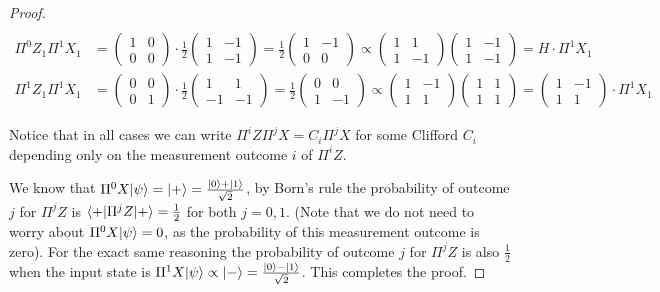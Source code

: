 \begin{proof}
\begin{align*}
	\end{align*}
	\begin{align*}
		\Pi^0 Z_1 \Pi^1 X_1 &= 
		\begin{pmatrix} 1 & 0 \\ 0 & 0 \end{pmatrix} 
		\cdot 
		\frac{1}{2} \begin{pmatrix} 1 & -1 \\ 1 & -1 \end{pmatrix}
		=
		\frac{1}{2} \begin{pmatrix} 1 & -1 \\ 0 & 0 \end{pmatrix}	
		\propto
		\begin{pmatrix} 1 & 1 \\ 1 & -1 \end{pmatrix} 
		\begin{pmatrix} 1 & -1 \\ 1 & -1	\end{pmatrix}
		= H \cdot \Pi^1 X_1
	\end{align*}
	\begin{align*}
		\Pi^1 Z_1 \Pi^1 X_1 &= 
		\begin{pmatrix} 0 & 0 \\ 0 & 1 \end{pmatrix} 
		\cdot 
		\frac{1}{2} \begin{pmatrix} 1 & 1 \\ -1 & -1 \end{pmatrix}
		=
		\frac{1}{2} \begin{pmatrix} 0 & 0 \\ 1 & -1 \end{pmatrix}	
		\propto
		\begin{pmatrix} 1 & -1 \\ 1 & 1 \end{pmatrix} 
		\begin{pmatrix} 1 & 1 \\ 1 & 1	\end{pmatrix}
		=  \begin{pmatrix} 1 & -1 \\ 1 & 1 \end{pmatrix} \cdot \Pi^1 X_1
	\end{align*}

	Notice that in all cases we can write $\Pi^i Z \Pi^j X = C_i \Pi^j X$ for some Clifford $C_i$ depending only on the measurement outcome $i$ of $\Pi^i Z$.

	We know that $\Pi^0 X |\psi\rangle = |+\rangle = \frac{|0\rangle + |1\rangle}{\sqrt{2}}$, by Born's rule the probability of outcome $j$ for $\Pi^j Z$ is $\langle+| \Pi^j Z |+\rangle = \frac{1}{2}$ for both $j = 0, 1$. 
	(Note that we do not need to worry about $\Pi^0 X |\psi\rangle = 0$, as the probability of this measurement outcome is zero).
	For the exact same reasoning the probability of outcome $j$ for $\Pi^j Z$ is also $\frac{1}{2}$ when the input state is $\Pi^1 X |\psi\rangle \propto |-\rangle = \frac{|0\rangle - |1\rangle}{\sqrt{2}}$.
	This completes the proof.
\end{proof}

